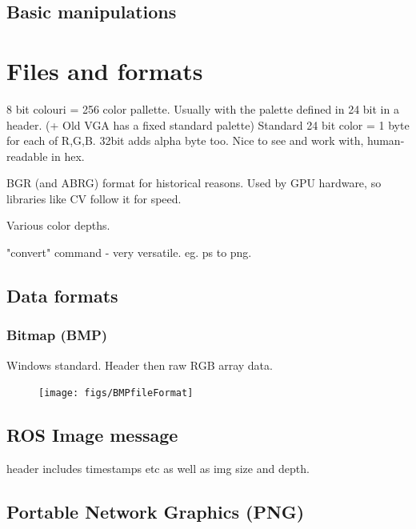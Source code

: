 \documentclass[oneside,english]{scrbook}
\begin{document}



\section{Basic manipulations}


\chapter{Files and formats}

8 bit colouri = 256 color pallette. Usually with the palette defined in 24 bit in a header. (+ Old VGA has a fixed standard palette)
Standard 24 bit color = 1 byte for each of R,G,B. 32bit adds alpha byte too.  Nice to see and work with, human-readable in hex.

BGR (and ABRG) format for historical reasons. Used by GPU hardware, so libraries like CV follow it for speed.

Various color depths.

"convert" command - very versatile. eg. ps to png.


\section{Data formats}



\subsection{Bitmap (BMP)}

Windows standard. Header then raw RGB array data.

\begin{figure}
	\caption{}
	\texttt{[image: figs/BMPfileFormat]}
\end{figure}



\section{ROS Image message}

header includes timestamps etc as well as img size and depth.


\section{Portable Network Graphics (PNG)}
\end{document}
